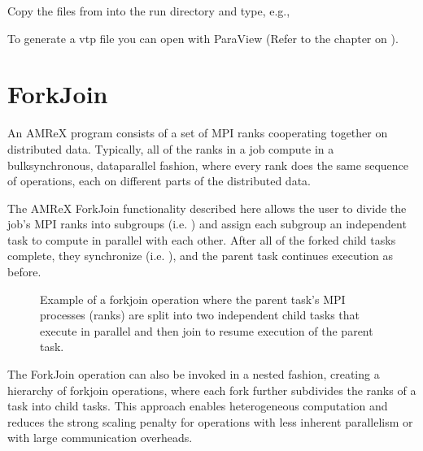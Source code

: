 \documentclass[letterpaper,10pt,english]{sphinxmanual}
\begin{document}
\sphinxAtStartPar
Copy the files from  into
the run directory and type, e.g.,

\begin{sphinxVerbatim}[commandchars=\\\{\}]
\end{sphinxVerbatim}

\sphinxAtStartPar
To generate a vtp file you can open with ParaView (Refer to the chapter on {\hyperref[\detokenize{Visualization_Chapter:chap-visualization}]{}}).


\chapter{Fork\sphinxhyphen{}Join}
\label{\detokenize{ForkJoin:fork-join}}\label{\detokenize{ForkJoin::doc}}
\sphinxAtStartPar
An AMReX program consists of a set of MPI ranks cooperating together on
distributed data.
Typically, all of the ranks in a job compute in a bulk\sphinxhyphen{}synchronous,
data\sphinxhyphen{}parallel fashion, where every rank does the same sequence of
operations, each on different parts of the distributed data.

\sphinxAtStartPar
The AMReX Fork\sphinxhyphen{}Join functionality described here allows the user to divide the
job’s MPI ranks into subgroups (i.e. ) and assign each subgroup
an independent task to compute in parallel with each other.
After all of the forked child tasks complete, they synchronize
(i.e. ), and the parent task continues execution as before.

\begin{figure}[htbp]
\centering
\capstart

\noindent{}
\caption{Example of a fork\sphinxhyphen{}join operation where the parent task’s MPI processes (ranks) are
split into two independent child tasks that execute in parallel and
then join to resume execution of the parent task.}\label{\detokenize{ForkJoin:id1}}\end{figure}

\sphinxAtStartPar
The Fork\sphinxhyphen{}Join operation can also be invoked in a nested fashion,
creating a hierarchy of fork\sphinxhyphen{}join operations, where each fork further
subdivides the ranks of a task into child tasks.
This approach enables heterogeneous computation and reduces the strong
scaling penalty for operations with less inherent parallelism or with
large communication overheads.
\end{document}
